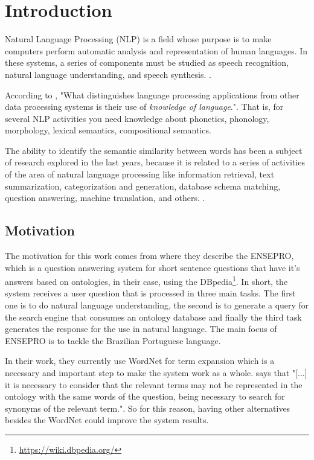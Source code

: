 \section{Introduction}\label{chap:intro}

Natural Language Processing (NLP) is a field whose purpose is to make computers perform automatic analysis and representation of human languages. In these systems, a series of components must be studied as speech recognition, natural language understanding, and speech synthesis. \cite{DBLP:journals/corr/abs-1708-02709, Jurafsky:2009:SLP:1214993}.

According to , "What distinguishes language processing applications from other data processing systems is their use of \textit{knowledge of language}.". That is, for several NLP activities you need knowledge about phonetics, phonology, morphology, lexical semantics, compositional semantics.

The ability to identify the semantic similarity between words has been a subject of research explored in the last years, because it is related to a series of activities of the area of natural language processing like information retrieval, text summarization, categorization and generation, database schema matching, question answering, machine translation, and others. \cite{Pawar2018CalculatingTS, SRAVANTHI2017SemanticSB, Islam2007ApplicationsOC}. 

\subsection{Motivation} 

The motivation for this work comes from  where they describe the ENSEPRO, which is a question answering system for short sentence questions that have it's answers based on ontologies, in their case, using the DBpedia\footnote{\url{https://wiki.dbpedia.org/}}. In short, the system receives a user question that is processed in three main tasks. The first one is to do natural language understanding, the second is to generate a query for the search engine that consumes an ontology database and finally the third task generates the response for the use in natural language. The main focus of ENSEPRO is to tackle the Brazilian Portuguese language. 

In their work, they currently use WordNet for term expansion which is a necessary and important step to make the system work as a whole.  says that 
"[...] it is necessary to consider that the relevant terms may not be represented in the ontology with the same words of the question, being necessary to search for synonyms of the relevant term.". 
So for this reason, having other alternatives besides the WordNet could improve the system results.

